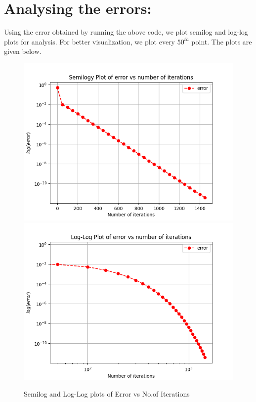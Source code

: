 \documentclass{article}
\begin{document}
\section{Analysing the errors:}
  Using the error obtained by running the above code, we plot semilog and log-log plots for analysis.
  For better visualization, we plot every $50^{th}$ point. \newline The plots are given below. 
      \begin{figure}[!tbh]
      \centering
      \includegraphics[scale=0.8]{semilog1.png}  
      \includegraphics[scale=0.8]{loglog.png}  
      \caption{Semilog and Log-Log plots of Error vs No.of Iterations}
      \end{figure}
\end{document}
